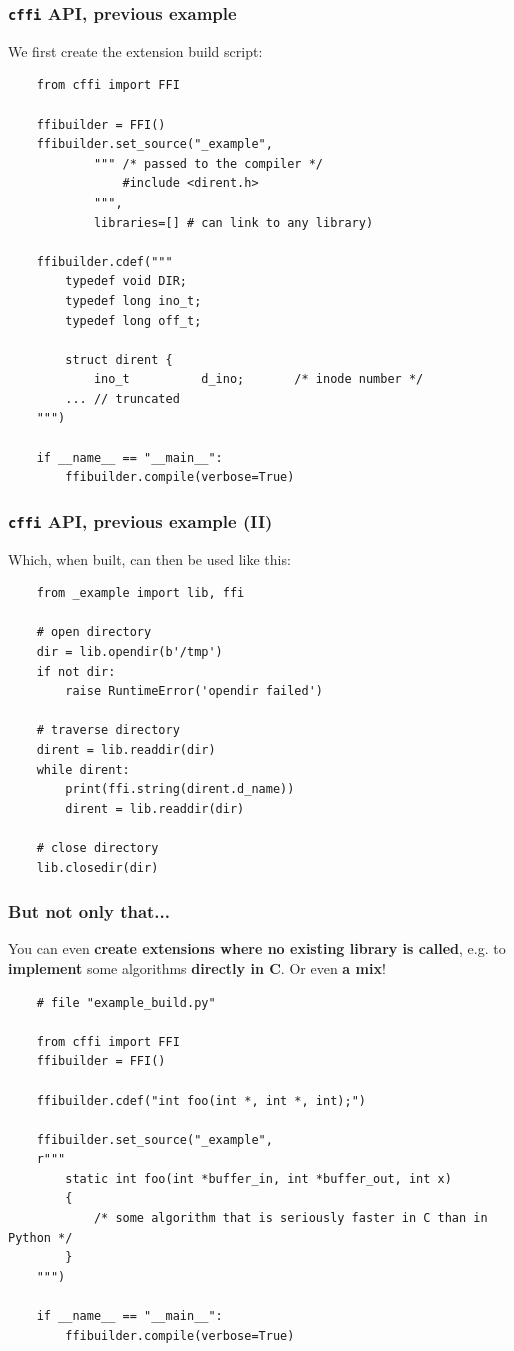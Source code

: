 \documentclass{beamer}
\begin{document}
\begin{frame}[fragile]
  \frametitle{\texttt{cffi} API, previous example}

  We first create the extension build script:

  \begin{verbatim}
    from cffi import FFI

    ffibuilder = FFI()
    ffibuilder.set_source("_example",
            """ /* passed to the compiler */
                #include <dirent.h>
            """,
            libraries=[] # can link to any library)

    ffibuilder.cdef("""
        typedef void DIR;
        typedef long ino_t;
        typedef long off_t;

        struct dirent {
            ino_t          d_ino;       /* inode number */
        ... // truncated
    """)

    if __name__ == "__main__":
        ffibuilder.compile(verbose=True)
  \end{verbatim}
\end{frame}

\begin{frame}[fragile]
  \frametitle{\texttt{cffi} API, previous example (II)}

  Which, when built, can then be used like this:

  \begin{verbatim}
    from _example import lib, ffi

    # open directory
    dir = lib.opendir(b'/tmp')
    if not dir:
        raise RuntimeError('opendir failed')

    # traverse directory
    dirent = lib.readdir(dir)
    while dirent:
        print(ffi.string(dirent.d_name))
        dirent = lib.readdir(dir)

    # close directory
    lib.closedir(dir)
  \end{verbatim}
\end{frame}

\begin{frame}[fragile]
  \frametitle{But not only that...}

  You can even \textbf{create extensions where no existing library is called},
  e.g. to \textbf{implement} some algorithms \textbf{directly in C}. Or even
  \textbf{a mix}!

  \begin{verbatim}
    # file "example_build.py"

    from cffi import FFI
    ffibuilder = FFI()

    ffibuilder.cdef("int foo(int *, int *, int);")

    ffibuilder.set_source("_example",
    r"""
        static int foo(int *buffer_in, int *buffer_out, int x)
        {
            /* some algorithm that is seriously faster in C than in Python */
        }
    """)

    if __name__ == "__main__":
        ffibuilder.compile(verbose=True)
  \end{verbatim}
\end{frame}
\end{document}
